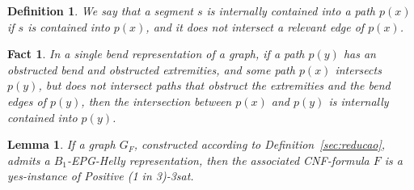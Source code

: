 \documentclass[9pt]{entcs}
\newtheorem{lema}{Lemma}[section]
\newtheorem{defi}{Definition}[section]
\newtheorem{fac}{Fact}[section]
\begin{document}
% 




\begin{defi}
We say that a segment $s$ is \emph{internally contained} into a path $p(x)$ if $s$ is contained into $p(x)$, and it does not intersect a relevant edge of $p(x)$. 
\end{defi}

\begin{fac}
In a single bend representation of a graph, if a path $p(y)$ has an obstructed bend and obstructed extremities, and some path $p(x)$ intersects $p(y)$, but does not intersect paths that obstruct the extremities and the bend edges of $p(y)$, then the intersection between $p(x)$ and $p(y)$ is internally contained into $p(y)$. 
\end{fac}


\begin{lema}\label{lem:volta}
If a graph $G_F$, constructed according to Definition~\ref{sec:reducao}, admits a $B_1$-EPG-Helly representation, then the associated CNF-formula $F$ is a yes-instance of {\sc Positive (1 in 3)-3sat}.
\end{lema}
\end{document}
